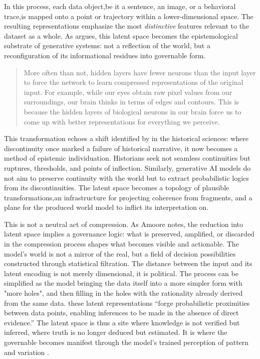 In this process, each data object,be it a sentence, an image, or a behavioral trace,is mapped onto a point or trajectory within a lower-dimensional space. The resulting representations emphasize the most \emph{distinctive} features relevant to the dataset as a whole. As \textcite[4]{amoore2024} argues, this latent space becomes the epistemological substrate of generative systems: not a reflection of the world, but a reconfiguration of its informational residues into governable form.


\begin{quote}
	More often than not, hidden layers have fewer neurons than the input layer to
	force the network to learn compressed representations of the original input.
	For example, while our eyes obtain raw pixel values from our surroundings,
	our brain thinks in terms of edges and contours. This is because the hidden
	layers of biological neurons in our brain force us to come up with better
	representations for everything we perceive. \parencite{buduma2022}
\end{quote}

This transformation echoes a shift identified by \textcite[7--9]{foucault2012a} in the historical sciences: where discontinuity once marked a failure of historical narrative, it now becomes a method of epistemic individuation. Historians seek not seamless continuities but ruptures, thresholds, and points of inflection. Similarly, generative AI models do not aim to preserve continuity with the world but to extract probabilistic logics from its discontinuities. The latent space becomes a topology of plausible transformations,an infrastructure for projecting coherence from fragments, and a plane for the produced world model to inflict its interpretation on.

This is not a neutral act of compression. As Amoore notes, the reduction into latent space implies a governance logic: what is preserved, amplified, or discarded in the compression process shapes what becomes visible and actionable. The model’s world is not a mirror of the real, but a field of decision possibilities constructed through statistical filtration. The distance between the input and its latent encoding is not merely dimensional, it is political. The process can be simplified as the model bringing the data itself into a more simpler form with "more holes", and then filling in the holes with the rationality already derived from the same data. these latent representations “forge probabilistic proximities between data points, enabling inferences to be made in the absence of direct evidence.” The latent space is thus a site where knowledge is not verified but inferred, where truth is no longer deduced but estimated. It is where the governable becomes manifest through the model’s trained perception of pattern and variation \parencite[5]{amoore2024}.

